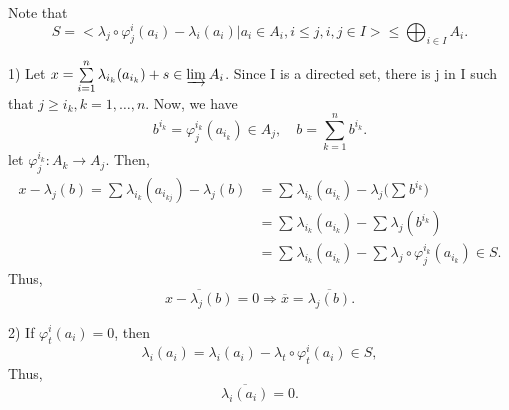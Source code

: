 \documentclass[../category_theory.tex]{subfiles}
\begin{document}
\begin{proof*}
	Note that
	\[
		S=\biggl<\lambda_{j}\circ \varphi_{j}^{i}(a_{i})-\lambda_{i}(a_{i})| a_{i}\in A_{i}, i\leq j, i, j\in I\biggr>\leq \bigoplus_{i\in I}A_{i}.
	\]

	1) Let \(x=\sum\limits_{i=1}^{n}\lambda_{i_{k}}(a_{i_{k}})+s\in \varinjlim_{}A_{i}\). Since I is a directed set, there is j in I such that \(j\geq i_{k}, k=1,\dotsc ,n\). Now, we have
	\[
		b^{i_{k}}=\varphi_{j}^{i_{k}}(a_{i_k})\in A_{j},\quad b=\sum\limits_{k=1}^{n}b^{i_{k}}.
	\]
	let \(\varphi_{j}^{i_{k}}:A_{k}\rightarrow A_{j}\). Then,
	\begin{align*}
		x-\lambda_{j}(b)=\sum\limits_{}^{}\lambda_{i_{k}}(a_{i_{kj}})-\lambda_{j}(b) & =\sum\limits_{}^{}\lambda_{i_{k}}(a_{i_{k}})-\lambda_{j}\biggl(\sum\limits_{}^{}b^{i_{k}}\biggr)                    \\
		                                                                             & =\sum\limits_{}^{}\lambda_{i_{k}}(a_{i_{k}})-\sum\limits_{}^{}\lambda_{j}(b^{i_{k}})                                \\
		                                                                             & =\sum\limits_{}^{}\lambda_{i_{k}}(a_{i_{k}})-\sum\limits_{}^{}\lambda_{j}\circ \varphi_{j}^{i_{k}}(a_{i_{k}})\in S.
	\end{align*}
	Thus,
	\[
		\overline{x-\lambda_{j}(b)}=0\Rightarrow \overline{x}=\overline{\lambda_{j}(b)}.
	\]

	2) If \(\varphi_{t}^{i}(a_{i})=0 \), then
	\[
		\lambda_{i}(a_{i})=\lambda_{i}(a_{i})-\lambda_{t}\circ \varphi_{t}^{i}(a_{i})\in S,
	\]
	Thus,
	\[
		\overline{\lambda_{i}(a_{i})}=0.
	\]


\end{proof*}
\end{document}
